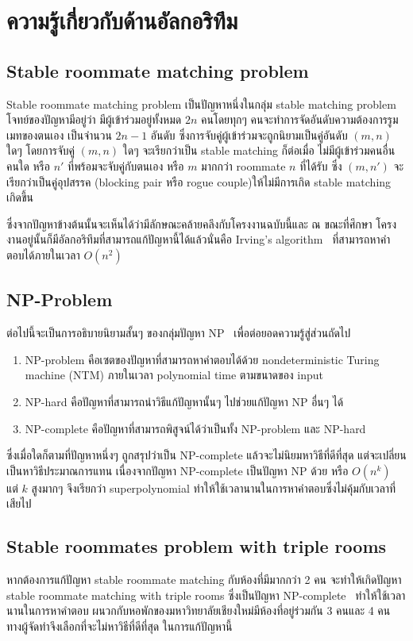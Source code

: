 
\section{ความรู้เกี่ยวกับด้านอัลกอริทึม}
\label{sec:rmp}
\subsection{Stable roommate matching problem}
Stable roommate matching problem เป็นปัญหาหนึ่งในกลุ่ม stable matching problem
โจทย์ของปัญหามีอยู่ว่า มีผู้เข้าร่วมอยู่ทั้งหมด $2n$ คนโดยทุกๆ คนจะทำการจัดอันดับความต้องการรูมเมทของตนเอง
เป็นจำนวน $2n-1$ อันดับ ซึ่งการจับคู่ผู้เข้าร่วมจะถูกนิยามเป็นคู่อันดับ $(m,n)$ ใดๆ โดยการจับคู่ $(m,n)$ ใดๆ จะเรียกว่าเป็น
stable matching ก็ต่อเมื่อ ไม่มีผู้เข้าร่วมคนอื่นคนใด หรือ $n'$ ที่พร้อมจะจับคู่กับตนเอง หรือ $m$ มากกว่า roommate $n$ ที่ได้รับ ซึ่ง $(m, n')$
จะเรียกว่าเป็นคู่อุปสรรค (blocking pair หรือ rogue couple)ให้ไม่มีการเกิด stable matching เกิดขึ้น

ซึ่งจากปัญหาข้างต้นนั้นจะเห็นได้ว่ามีลักษณะคล้ายคลึงกับโครงงานฉบับนี้และ ณ ขณะที่ศึกษา
โครงงานอยู่นั้นก็มีอัลกอริทึมที่สามารถแก้ปัญหานี้ได้แล้วนั่นคือ Irving's algorithm~\cite{irving1985efficient} ที่สามารถหาคำตอบได้ภายในเวลา $O(n^2)$

\subsection{NP-Problem}
ต่อไปนี้จะเป็นการอธิบายนิยามสั้นๆ ของกลุ่มปัญหา NP~\cite{np} เพื่อต่อยอดความรู้สู่ส่วนถัดไป
\begin{enumerate}
  \item NP-problem คือเซตของปัญหาที่สามารถหาคำตอบได้ด้วย nondeterministic 
    Turing machine (NTM) ภายในเวลา polynomial time ตามขนาดของ input
  \item  NP-hard คือปัญหาที่สามารถนำวิธีแก้ปัญหานั้นๆ ไปช่วยแก้ปัญหา NP อื่นๆ ได้
  \item  NP-complete คือปัญหาที่สามารถพิสูจน์ได้ว่าเป็นทั้ง NP-problem และ NP-hard
\end{enumerate}
ซึ่งเมื่อใดก็ตามที่ปัญหาหนึ่งๆ ถูกสรุปว่าเป็น NP-complete แล้วจะไม่นิยมหาวิธีที่ดีที่สุด
แต่จะเปลี่ยนเป็นหาวิธีประมาณการแทน เนื่องจากปัญหา NP-complete 
เป็นปัญหา NP ด้วย หรือ $O(n^k)$
แต่ $k$ สูงมากๆ จึงเรียกว่า superpolynomial ทำให้ใช้เวลานานในการหาคำตอบซึ่งไม่คุ้มกับเวลาที่เสียไป

\subsection{Stable roommates problem with triple rooms}
หากต้องการแก้ปัญหา stable roommate matching กับห้องที่มีมากกว่า 2 คน จะทำให้เกิดปัญหา
stable roommate matching with triple rooms ซึ่งเป็นปัญหา NP-complete~\cite{iwama2007stable}
ทำให้ใช้เวลานานในการหาคำตอบ ผนวกกับหอพักของมหาวิทยาลัยเชียงใหม่มีห้องที่อยู่ร่วมกัน 3 คนและ 4 คน
ทางผู้จัดทำจึงเลือกที่จะไม่หาวิธีที่ดีที่สุด ในการแก้ปัญหานี้

